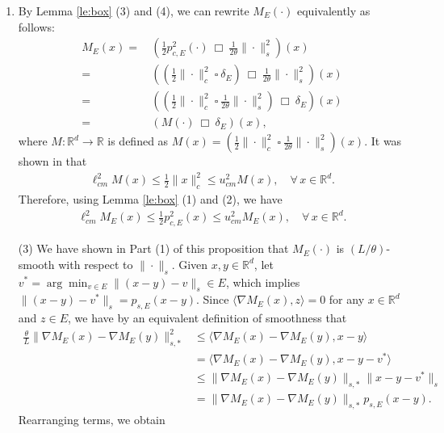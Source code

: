 \documentclass[11 pt]{article}
\begin{document}
\begin{enumerate}[(1)]
		\item By Lemma \ref{le:box} (3) and (4), we can rewrite $M_E(\cdot)$ equivalently as follows:
		\begin{align*}
			M_E(x) =\,& \left(\frac{1}{2}p^2_{c,E}(\cdot) ~\Box~ \frac{1}{2\theta} \| \cdot \|^2_s\right)(x)  \\
			=\,&\left(\left(\frac{1}{2} \| \cdot \|^2_c ~\square~ \delta_E \right) ~\Box~ \frac{1}{2\theta} \| \cdot \|^2_s\right)(x)  \\
			=\,&\left(\left(\frac{1}{2} \| \cdot \|^2_c ~\square~ \frac{1}{2\theta} \| \cdot \|^2_s\right) ~\Box~ \delta_E\right)(x)\\
			=\,&\left(M(\cdot)~\Box~ \delta_E\right)(x),
		\end{align*}
		where $M:\mathbb{R}^d\to \mathbb{R}$ is defined as $M(x)=\left(\frac{1}{2} \| \cdot \|^2_c ~\square~ \frac{1}{2\theta} \| \cdot \|^2_s\right)(x)$. It was shown in \cite{chen2021lyapunov} that
		\begin{align*}
			\ell^2_{cm}M(x) \leq \frac{1}{2}\| x \|^2_c \leq u^2_{cm}M(x),\quad \forall\, x \in \mathbb{R}^d.
		\end{align*}
		Therefore, using Lemma \ref{le:box} (1) and (2), we have
		\begin{align*}
			\ell^2_{cm}M_E(x) \leq \frac{1}{2}p^2_{c,E}(x) \leq u^2_{cm}M_E(x),\quad\forall\, x \in \mathbb{R}^d.
		\end{align*}
		\item[(3)] We have shown in Part (1) of this proposition that $M_E(\cdot)$ is $(L/\theta)$-smooth with respect to $\| \cdot \|_s$. Given $x,y\in\mathbb{R}^d$, let $v^* = \arg\min_{v \in E} \| (x - y) - v \|_s \in E$, which implies $\| (x-y)- v^* \|_s = p_{s,E}(x-y)$. Since $\langle \nabla M_E(x),z\rangle=0$ for any $x\in\mathbb{R}^d$ and $z\in E$, we have by an equivalent definition of smoothness that
		\begin{align}
			\frac{\theta}{L}\| \nabla M_E(x) - \nabla M_E(y) \|^2_{s,*} &\leq \langle \nabla M_E(x) - \nabla M_E(y), x - y \rangle \nonumber\\
			&=\langle \nabla M_E(x) - \nabla M_E(y), x - y - v^*\rangle\nonumber\\
			&\leq \| \nabla M_E(x) - \nabla M_E(y)\|_{s,*} \| x - y - v^*\|_s\nonumber\\
			&= \| \nabla M_E(x) - \nabla M_E(y)\|_{s,*} p_{s,E}(x - y). \label{eq:substitute_back}
		\end{align}
		Rearranging terms, we obtain
		\begin{align*}

\end{align*}
\end{enumerate}
\end{document}
